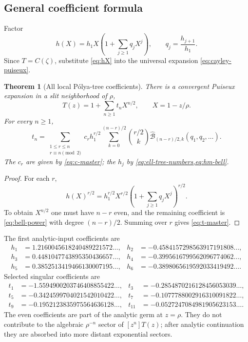\documentclass[11pt]{article}
\newtheorem{theorem}{Theorem}[section]
\theoremstyle{definition}
\theoremstyle{remark}
\newcommand{\Bell}{\widehat{\mathcal B}}
\begin{document}
\subsection{General coefficient formula}

Factor
\begin{equation}
 h(X)=h_1X\left(1+\sum_{j\geq1}q_jX^j\right),
 \qquad q_j=\frac{h_{j+1}}{h_1}.
 \label{eq:qj}
\end{equation}
Since $T=C(\zeta)$, substitute \cref{eq:hX} into the universal expansion
\cref{eq:cayley-puiseux}.

\begin{theorem}[All local P\'olya-tree coefficients]
\label{thm:t-coefficients}
There is a convergent Puiseux expansion in a slit neighborhood of $\rho$,
\begin{equation}
 T(z)=1+\sum_{n\geq1}t_nX^{n/2},
 \qquad X=1-z/\rho.
 \label{eq:T-puiseux}
\end{equation}
For every $n\geq1$,
\begin{equation}
 \boxed{
 t_n=
 \sum_{\substack{1\leq r\leq n\\r\equiv n\pmod2}}
 c_r h_1^{r/2}
 \sum_{k=0}^{(n-r)/2}
 \binom{r/2}{k}
 \Bell_{(n-r)/2,k}(q_1,q_2,\ldots).}
 \label{eq:t-master}
\end{equation}
The $c_r$ are given by \cref{eq:c-master}; the $h_j$ by
\cref{eq:ell-tree-numbers,eq:hm-bell}.
\end{theorem}

\begin{proof}
For each $r$,
\[
 h(X)^{r/2}=h_1^{r/2}X^{r/2}
 \left(1+\sum_{j\geq1}q_jX^j\right)^{r/2}.
\]
To obtain $X^{n/2}$ one must have $n-r$ even, and the remaining coefficient
is \cref{eq:bell-power} with degree $(n-r)/2$.  Summing over $r$ gives
\cref{eq:t-master}.
\end{proof}

The first analytic-input coefficients are
\begin{align*}
 h_1&= 1.2160045618240489221572\ldots,&
 h_2&=-0.4584157298563917191808\ldots,\\
 h_3&= 0.4481047743895350436657\ldots,&
 h_4&=-0.3995616799562096774062\ldots,\\
 h_5&= 0.3852513419466130007195\ldots,&
 h_6&=-0.3898065619592033419492\ldots.
\end{align*}
Selected singular coefficients are
\begin{align*}
 t_1&=-1.5594900203746408855422\ldots,&
 t_3&=-0.2854870216128456053039\ldots,\\
 t_5&=-0.3424599704021542010422\ldots,&
 t_7&=-0.1077788002916310091822\ldots,\\
 t_9&=-0.1952123835975564636128\ldots,&
 t_{11}&=-0.0527247084981905623153\ldots.
\end{align*}
The even coefficients are part of the analytic germ at $z=\rho$.  They do
not contribute to the algebraic $\rho^{-n}$ sector of $[z^n]T(z)$; after
analytic continuation they are absorbed into more distant exponential
sectors.
\end{document}
